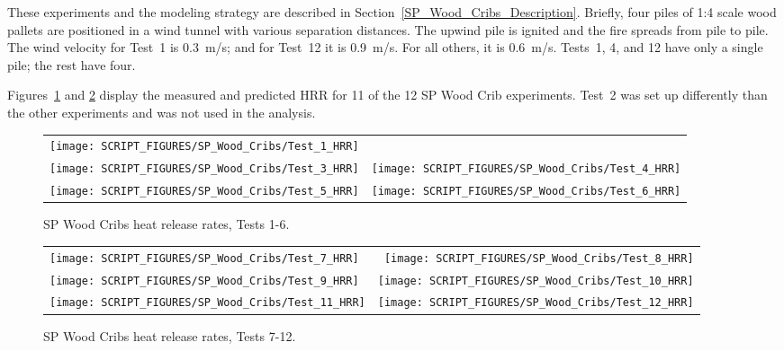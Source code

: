 These experiments and the modeling strategy are described in Section~\ref{SP_Wood_Cribs_Description}. Briefly, four piles of 1:4 scale wood pallets are positioned in a wind tunnel with various separation distances. The upwind pile is ignited and the fire spreads from pile to pile. The wind velocity for Test~1 is 0.3~m/s; and for Test~12 it is 0.9~m/s. For all others, it is 0.6~m/s. Tests~1, 4, and 12 have only a single pile; the rest have four.

Figures~\ref{SP_Wood_Cribs_HRR_1} and \ref{SP_Wood_Cribs_HRR_2} display the measured and predicted HRR for 11 of the 12 SP Wood Crib experiments. Test~2 was set up differently than the other experiments and was not used in the analysis.

\begin{figure}[!ht]
\begin{tabular*}{\textwidth}{l@{\extracolsep{\fill}}r}
\texttt{[image: SCRIPT\_FIGURES/SP\_Wood\_Cribs/Test\_1\_HRR]} &
 \\
\texttt{[image: SCRIPT\_FIGURES/SP\_Wood\_Cribs/Test\_3\_HRR]} &
\texttt{[image: SCRIPT\_FIGURES/SP\_Wood\_Cribs/Test\_4\_HRR]} \\
\texttt{[image: SCRIPT\_FIGURES/SP\_Wood\_Cribs/Test\_5\_HRR]} &
\texttt{[image: SCRIPT\_FIGURES/SP\_Wood\_Cribs/Test\_6\_HRR]}
\end{tabular*}
\caption[SP Wood Cribs heat release rates, Tests 1-6]{SP Wood Cribs heat release rates, Tests 1-6.}
\label{SP_Wood_Cribs_HRR_1}
\end{figure}

\begin{figure}[p]
\begin{tabular*}{\textwidth}{l@{\extracolsep{\fill}}r}
\texttt{[image: SCRIPT\_FIGURES/SP\_Wood\_Cribs/Test\_7\_HRR]} &
\texttt{[image: SCRIPT\_FIGURES/SP\_Wood\_Cribs/Test\_8\_HRR]} \\
\texttt{[image: SCRIPT\_FIGURES/SP\_Wood\_Cribs/Test\_9\_HRR]} &
\texttt{[image: SCRIPT\_FIGURES/SP\_Wood\_Cribs/Test\_10\_HRR]} \\
\texttt{[image: SCRIPT\_FIGURES/SP\_Wood\_Cribs/Test\_11\_HRR]} &
\texttt{[image: SCRIPT\_FIGURES/SP\_Wood\_Cribs/Test\_12\_HRR]}
\end{tabular*}
\caption[SP Wood Cribs heat release rates, Tests 7-12]{SP Wood Cribs heat release rates, Tests 7-12.}
\label{SP_Wood_Cribs_HRR_2}
\end{figure}


